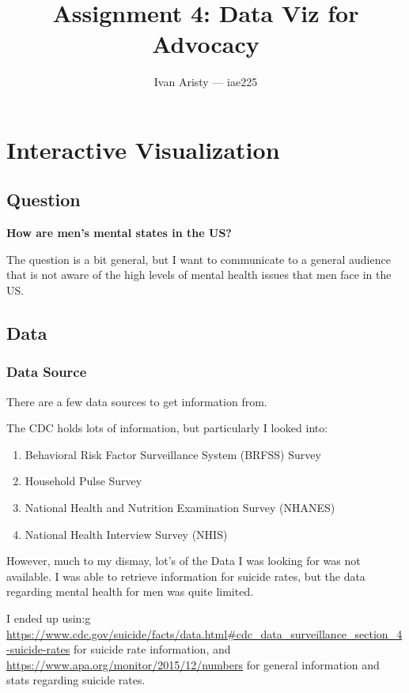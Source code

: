 \documentclass{article}
\title{Assignment 4: Data Viz for Advocacy}
\author{Ivan Aristy — iae225}
\begin{document}
  \maketitle %
  \thispagestyle{empty}

\section{Interactive Visualization}

\subsection{Question}
\label{subsec:subsec1}

\textbf{How are men's mental states in the US?}

The question is a bit general, but I want to communicate to a general audience
that is not aware of the high levels of mental health issues that men face in the US.

\subsection{Data}
\label{subsec:subsec2}

\subsubsection{Data Source}
\label{subsubsec:Data Source}

There are a few data sources to get information from.

The CDC holds lots of information, but particularly I looked into:

\begin{enumerate}
  \item Behavioral Risk Factor Surveillance System (BRFSS) Survey
  \item Household Pulse Survey
  \item National Health and Nutrition Examination Survey (NHANES)
  \item National Health Interview Survey (NHIS)
\end{enumerate}

However, much to my dismay, lot's of the Data I was looking for 
was not available. I was able to retrieve information for suicide rates,
but the data regarding mental health for men was quite limited.

I ended up usin:g \url{https://www.cdc.gov/suicide/facts/data.html#cdc_data_surveillance_section_4-suicide-rates}
for suicide rate information, and \url{https://www.apa.org/monitor/2015/12/numbers}
for general information and stats regarding suicide rates.
\end{document}
